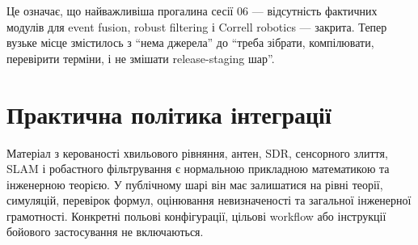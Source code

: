 Це означає, що найважливіша прогалина сесії 06 --- відсутність фактичних модулів для event fusion, robust filtering і Correll robotics --- закрита. Тепер вузьке місце змістилось з ``нема джерела'' до ``треба зібрати, компілювати, перевірити терміни, і не змішати release-staging шар''.

\section{Практична політика інтеграції}

Матеріал з керованості хвильового рівняння, антен, SDR, сенсорного злиття, SLAM і робастного фільтрування є нормальною прикладною математикою та інженерною теорією. У публічному шарі він має залишатися на рівні теорії, симуляцій, перевірок формул, оцінювання невизначеності та загальної інженерної грамотності. Конкретні польові конфігурації, цільові workflow або інструкції бойового застосування не включаються.

